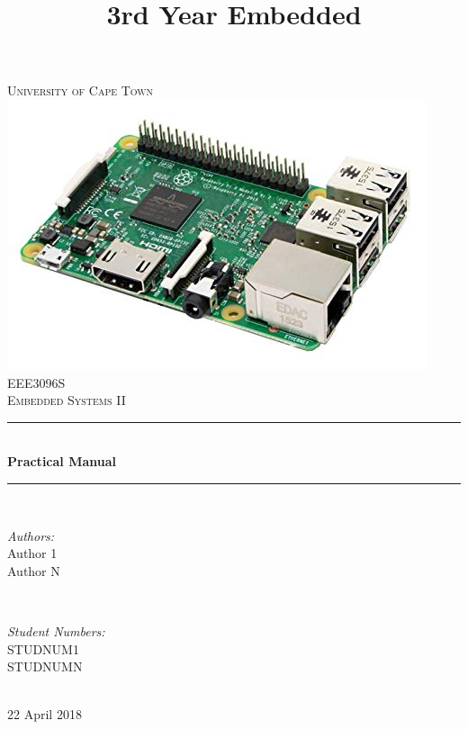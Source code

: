\title{3rd Year Embedded}


\begin{titlepage}
	\centering
	\vspace*{0.5 cm}
	
	\textsc{\LARGE University of Cape Town}\\[2.0 cm]	%
	\includegraphics[scale = 0.5]{Figures/rpi.jpg}\\[1 cm]	%
	\textsc{\Large EEE3096S}\\[0.5 cm]				%
	\textsc{\large Embedded Systems II}\\[0.5 cm]				%
	\rule{\linewidth}{0.2 mm} \\[0.4 cm]
	{ \huge \bfseries Practical Manual}\\
	\rule{\linewidth}{0.2 mm} \\[1.5 cm]
	
	\begin{minipage}{0.4\textwidth}
		\begin{flushleft} \large
			\emph{Authors:}\\
			Author 1\\
            Author N
		\end{flushleft}
	\end{minipage}~
	\begin{minipage}{0.4\textwidth}
		\begin{flushright} \large
			\emph{Student Numbers:} \\
			STUDNUM1\\	
            STUDNUMN
		\end{flushright}
	\end{minipage}\\[2 cm]
	
	{\large 22 April 2018}\\[2 cm]
	
	\vfill
	
\end{titlepage}